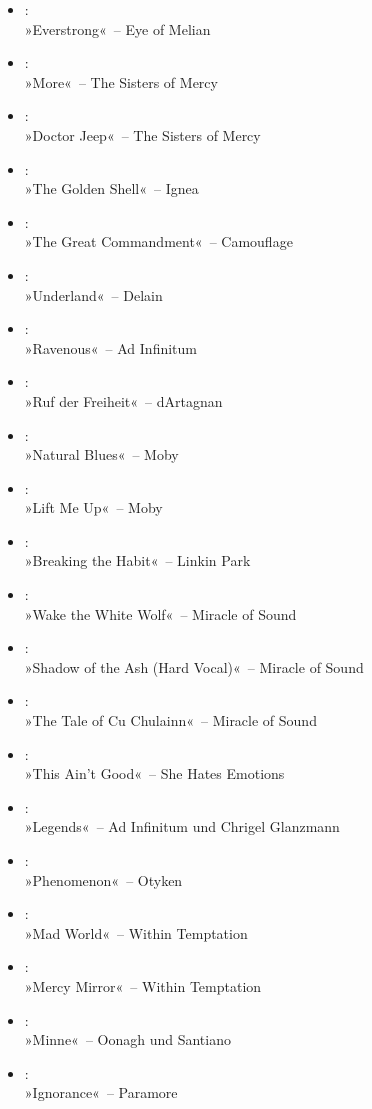 \begin{itemize}
    \item :\\ »Everstrong«~– Eye of Melian
    \item :\\ »More«~– The Sisters of Mercy
    \item :\\ »Doctor Jeep«~– The Sisters of Mercy
    \item :\\ »The Golden Shell«~– Ignea
    \item :\\ »The Great Commandment«~– Camouflage
    \item :\\ »Underland«~– Delain
    \item :\\ »Ravenous«~– Ad Infinitum
    \item :\\ »Ruf der Freiheit«~– dArtagnan
    \item :\\ »Natural Blues«~– Moby
    \item :\\ »Lift Me Up«~– Moby
    \item :\\ »Breaking the Habit«~– Linkin Park
    \item :\\ »Wake the White Wolf«~– Miracle of Sound
    \item :\\ »Shadow of the Ash (Hard Vocal)«~– Miracle of Sound
    \item :\\ »The Tale of Cu Chulainn«~– Miracle of Sound
    \item :\\ »This Ain’t Good«~– She Hates Emotions
    \item :\\ »Legends«~– Ad Infinitum und Chrigel Glanzmann
    \item :\\ »Phenomenon«~– Otyken
    \item :\\ »Mad World«~– Within Temptation
    \item :\\ »Mercy Mirror«~– Within Temptation
    \item :\\ »Minne«~– Oonagh und Santiano
    \item :\\ »Ignorance«~– Paramore

\end{itemize}
